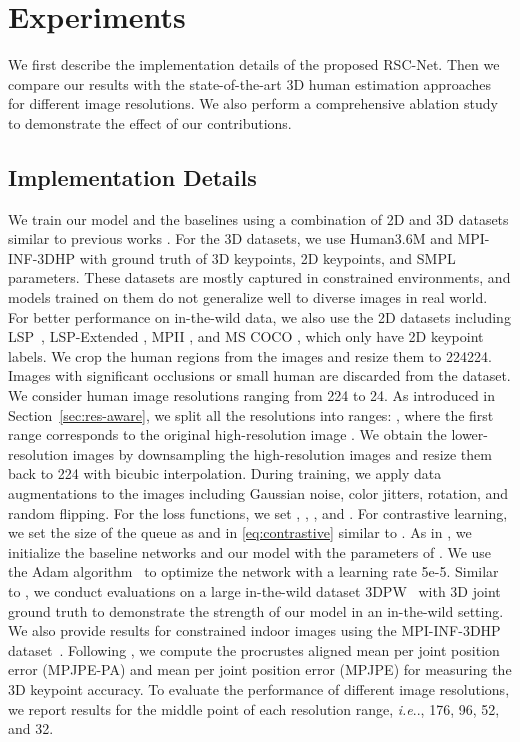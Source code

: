 \documentclass[runningheads]{llncs}
\makeatletter
\DeclareRobustCommand\onedot{\futurelet\@let@token\@onedot}
\def\@onedot{\ifx\@let@token.\else.\null\fi\xspace}
\def\ie{\emph{i.e}\onedot, } \def\Ie{\emph{I.e}\onedot}
\newcommand{\netname}{RSC-Net}
\makeatother
\begin{document}
\section{Experiments}
We first describe the implementation details of the proposed \netname{}.
Then we compare our results with the state-of-the-art 3D human estimation approaches for different image resolutions.
We also perform a comprehensive ablation study to demonstrate the effect of our contributions.







\subsection{Implementation Details}
We train our model and the baselines using a combination of 2D and 3D datasets similar to previous works \cite{kanazawa2018end,kolotouros2019spin}. 
For the 3D datasets, we use Human3.6M \cite{human3.6} and MPI-INF-3DHP \cite{mpi-inf-3dhp} with ground truth of 3D keypoints, 2D keypoints, and SMPL parameters.
These datasets are mostly captured in constrained environments, and models trained on them do not generalize well to diverse images in real world.
For better performance on in-the-wild data, we also use the 2D datasets including LSP~\cite{lsp}, LSP-Extended \cite{lsp-extend}, MPII \cite{mpii}, and MS COCO \cite{coco}, which only have 2D keypoint labels. 
We crop the human regions from the images and resize them to 224224.
Images with significant occlusions or small human are discarded from the dataset.
We consider human image resolutions ranging from 224 to 24.
As introduced in Section~\ref{sec:res-aware}, we split all the resolutions into  ranges: , where the first range corresponds to the original high-resolution image .
We obtain the lower-resolution images by downsampling the high-resolution images and resize them back to 224 with bicubic interpolation.
During training, we apply data augmentations to the images including Gaussian noise, color jitters, rotation, and random flipping.
For the loss functions, we set , , , and .
For contrastive learning, we set the size of the queue as  and  in \eqref{eq:contrastive} similar to \cite{chen2020simple}.
As in \cite{kocabas2019vibe}, we initialize the baseline networks and our model with the parameters of \cite{kolotouros2019spin}.
We use the Adam algorithm~\cite{kingma2014adam} to optimize the network with a learning rate 5e-5.
Similar to \cite{kocabas2019vibe}, we conduct evaluations on a large in-the-wild dataset 3DPW~\cite{3dpw} with 3D joint ground truth to demonstrate the strength of our model in an in-the-wild setting.
We also provide results for constrained indoor images using the MPI-INF-3DHP dataset~\cite{mpi-inf-3dhp}. 
Following \cite{kocabas2019vibe,kanazawa2018end,kolotouros2019spin}, we compute the procrustes aligned mean per joint position error (MPJPE-PA) and mean per joint position error (MPJPE) for measuring the 3D keypoint accuracy. 
To evaluate the performance of different image resolutions, we report results for the middle point of each resolution range, \ie 176, 96, 52, and 32. 
\end{document}
